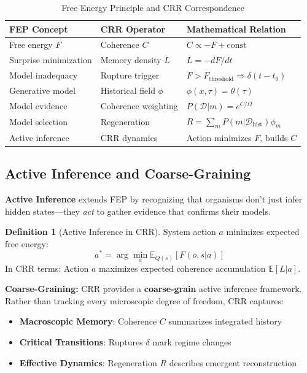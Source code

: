 \documentclass[11pt,a4paper]{article}
\theoremstyle{definition}
\newtheorem{definition}{Definition}[section]
\theoremstyle{remark}
\begin{document}
\begin{table}[H]
\centering
\caption{Free Energy Principle and CRR Correspondence}
\label{tab:fep-crr-correspondence}
\begin{tabular}{@{}lll@{}}
\toprule
\textbf{FEP Concept} & \textbf{CRR Operator} & \textbf{Mathematical Relation} \\
\midrule
Free energy $F$ & Coherence $C$ & $C \propto -F + \text{const}$ \\
Surprise minimization & Memory density $L$ & $L = -dF/dt$ \\
Model inadequacy & Rupture trigger & $F > F_{\text{threshold}} \Rightarrow \delta(t-t_0)$ \\
Generative model & Historical field $\phi$ & $\phi(x,\tau) = \theta(\tau)$ \\
Model evidence & Coherence weighting & $P(\mathcal{D}|m) = e^{C/\Omega}$ \\
Model selection & Regeneration & $R = \sum_m P(m|\mathcal{D}_{\text{hist}}) \phi_m$ \\
Active inference & CRR dynamics & Action minimizes $F$, builds $C$ \\
\bottomrule
\end{tabular}
\end{table}

\subsection{Active Inference and Coarse-Graining}

\textbf{Active Inference} extends FEP by recognizing that organisms don't just infer hidden states—they \emph{act} to gather evidence that confirms their models.

\begin{definition}[Active Inference in CRR]
System action $a$ minimizes expected free energy:
\begin{equation}
a^* = \arg\min_a \mathbb{E}_{Q(s)}[F(o,s|a)]
\end{equation}
In CRR terms: Action $a$ maximizes expected coherence accumulation $\mathbb{E}[L|a]$.
\end{definition}

\textbf{Coarse-Graining:} CRR provides a \textbf{coarse-grain} active inference framework. Rather than tracking every microscopic degree of freedom, CRR captures:

\begin{itemize}
\item \textbf{Macroscopic Memory}: Coherence $C$ summarizes integrated history
\item \textbf{Critical Transitions}: Ruptures $\delta$ mark regime changes
\item \textbf{Effective Dynamics}: Regeneration $R$ describes emergent reconstruction
\end{itemize}
\end{document}
